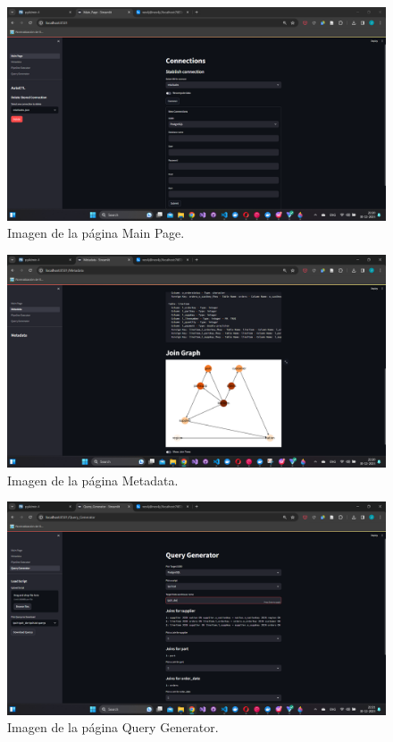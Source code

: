\begin{annexes}
    \begin{figure}
        \centering
        \includegraphics[scale=0.4]{Graphics/mainpage.png}
        \caption{Imagen de la p\'agina Main Page.}
        \label{fig:mainpage}
      \end{figure}

    \begin{figure}
        \centering
        \includegraphics[scale=0.4]{Graphics/metadata.png}
        \caption{Imagen de la p\'agina Metadata.}
        \label{fig:meta}
    \end{figure}

    \begin{figure}
        \centering
        \includegraphics[scale=0.4]{Graphics/querygene.png}
        \caption{Imagen de la p\'agina Query Generator.}
        \label{fig:generator}
    \end{figure}


\end{annexes}
